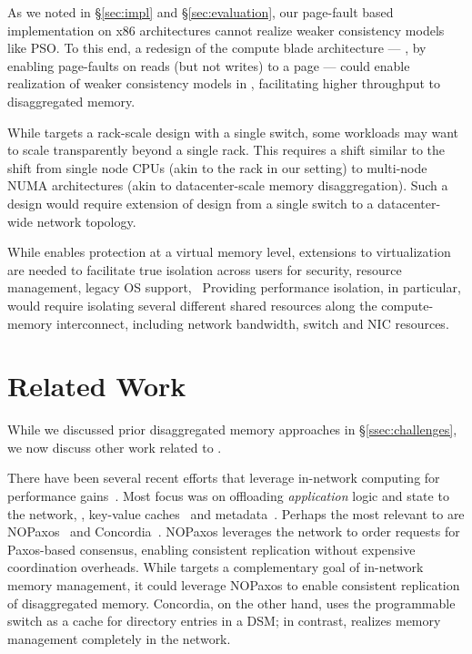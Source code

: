  As we noted in \S\ref{sec:impl} and \S\ref{sec:evaluation}, our page-fault based implementation on x86 architectures cannot realize weaker consistency models like PSO. To this end, a redesign of the compute blade architecture --- \eg, by enabling page-faults on reads (but not writes) to a page --- could enable realization of weaker consistency models in \mind, facilitating higher throughput to disaggregated memory.

 While \mind targets a rack-scale design with a single switch, some workloads may want to scale transparently beyond a single rack. This requires a shift similar to the shift from single node CPUs (akin to the rack in our setting) to multi-node NUMA architectures (akin to datacenter-scale memory disaggregation). Such a design would require extension of \mind design from a single switch to a datacenter-wide network topology.

 While \mind enables protection at a virtual memory level, extensions to virtualization are needed to facilitate true isolation across users for security, resource management, legacy OS support, \etc~Providing performance isolation, in particular, would require isolating several different shared resources along the compute-memory interconnect, including network bandwidth, switch and NIC resources.

\section{Related Work}
\label{sec:related}

While we discussed prior disaggregated memory approaches in \S\ref{ssec:challenges}, we now discuss other work related to \mind. 

 There have been several recent efforts that leverage in-network computing for performance gains~\cite{innetwork, pktsched, congestion1, congestion2, lb1, lb2, netpaxos, p4xos, nopaxos, synchrony, concurrency1, concurrency2, netlock, agg1, agg2, agg3, qp1, qp2}. Most focus was on offloading \textit{application} logic and state to the network, \eg, key-value caches~\cite{netcache, incbricks} and metadata~\cite{pegasus}. Perhaps the most relevant to \mind are NOPaxos~\cite{nopaxos} and Concordia~\cite{concordia}. NOPaxos leverages the network to order requests for Paxos-based consensus, enabling consistent replication without expensive coordination overheads. While \mind targets a complementary goal of in-network memory management, it could leverage NOPaxos to enable consistent replication of disaggregated memory. Concordia, on the other hand, uses the programmable switch as a cache for directory entries in a DSM; in contrast, \mind realizes memory management completely in the network.

